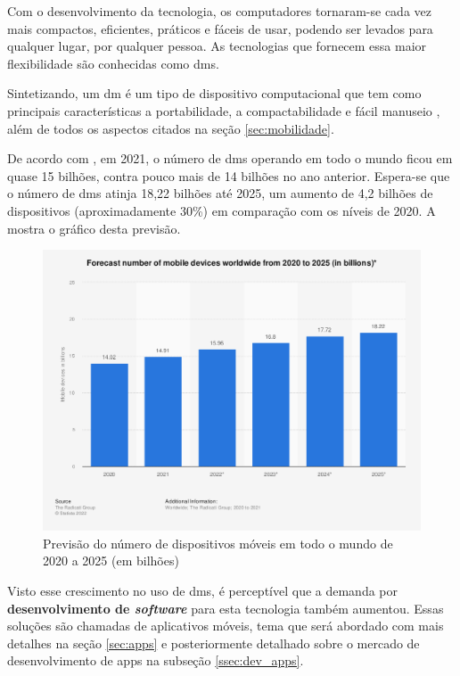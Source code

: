 Com o desenvolvimento da tecnologia, os computadores tornaram-se cada vez mais compactos, eficientes, práticos e fáceis de usar, podendo ser levados para qualquer lugar, por qualquer pessoa. As tecnologias que fornecem essa maior flexibilidade são conhecidas como \acp{dm}.

Sintetizando, um \ac{dm} é um tipo de dispositivo computacional que tem como principais características a portabilidade, a compactabilidade e fácil manuseio \citet{lee2005aplicaccoes}, além de todos os aspectos citados na seção \ref{sec:mobilidade}. 

De acordo com \citet{laricchia_2022}, em 2021, o número de \acp{dm} operando em todo o mundo ficou em quase 15 bilhões, contra pouco mais de 14 bilhões no ano anterior. Espera-se que o número de \acp{dm} atinja 18,22 bilhões até 2025, um aumento de 4,2 bilhões de dispositivos (aproximadamente 30\%) em comparação com os níveis de 2020. A  mostra o gráfico desta previsão.

\begin{figure}[H]
\centering
  \includegraphics[width=\columnwidth]{images/mobiles20to25.png}
  \caption{Previsão do número de dispositivos móveis em todo o mundo de 2020 a 2025 (em bilhões)}
  \label{fig:mobiles20to25}
\end{figure}

Visto esse crescimento no uso de \acp{dm}, é perceptível que a demanda por \textbf{desenvolvimento de \textit{software}} para esta tecnologia também aumentou. Essas soluções são chamadas de aplicativos móveis, tema que será abordado com mais detalhes na seção \ref{sec:apps} e posteriormente detalhado sobre o mercado de desenvolvimento de \acp{app} na subseção \ref{ssec:dev_apps}.

